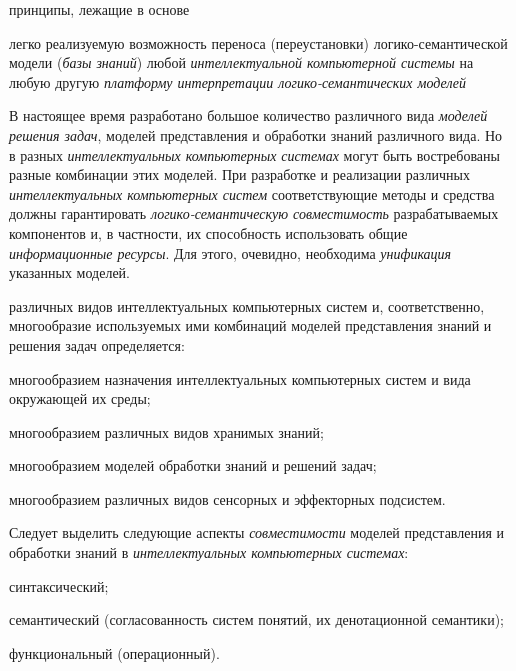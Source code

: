 \begin{SCn}
\begin{scnrelfromlistcustom}{принципы, лежащие в основе}
{\begin{textitemize}[labelsep=\tabsize-\bulletsize,leftmargin=\tabsize,label=$\bullet$,itemsep=0em,topsep=0.4em]
				\item легко реализуемую возможность переноса (переустановки) логико-семантической модели (\textit{базы знаний}) любой \textit{интеллектуальной компьютерной системы} на любую другую \textit{платформу интерпретации логико-семантических моделей}
				\end{textitemize}
		}	
		
	\end{scnrelfromlistcustom}
\end{SCn}

В настоящее время разработано большое количество различного вида \textit{моделей решения задач}, моделей представления и обработки знаний различного вида. Но в разных \textit{интеллектуальных компьютерных системах} могут быть востребованы разные комбинации этих моделей. При разработке и реализации различных \textit{интеллектуальных компьютерных систем} соответствующие методы и средства должны гарантировать \textit{логико-семантическую совместимость} разрабатываемых компонентов и, в частности, их способность использовать общие \textit{информационные ресурсы}. Для этого, очевидно, необходима \textit{унификация} указанных моделей.

 различных видов интеллектуальных компьютерных систем и, соответственно, многообразие используемых ими комбинаций моделей представления знаний и решения задач определяется:
\begin{textitemize}
	\item многообразием назначения интеллектуальных компьютерных систем и вида окружающей их среды;
	\item многообразием различных видов хранимых знаний;
	\item многообразием моделей обработки знаний и решений задач;
	\item многообразием различных видов сенсорных и эффекторных подсистем.
\end{textitemize}

Следует выделить следующие аспекты \textit{совместимости} моделей представления и обработки знаний в \textit{интеллектуальных компьютерных системах}:

\begin{textitemize}
	\item синтаксический;
	\item семантический (согласованность систем понятий, их денотационной семантики);
	\item функциональный (операционный).
\end{textitemize}

